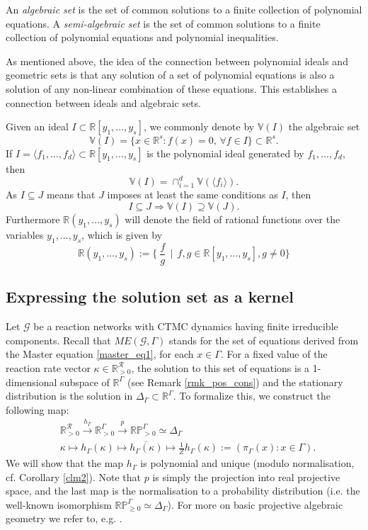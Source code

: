 \documentclass{amsart}
\theoremstyle{definition}
\theoremstyle{remark}
\theoremstyle{Conjecture/open problem}
\theoremstyle{assumption}
\theoremstyle{conjecture}
\newcommand{\st}{\,\mid \,}
\def\Pr{\mathbb{P}}
\def\Ga{\Gamma}
\def\k{\kappa}
\def\cG{\mathcal{G}}
\def\cR{\mathcal{R}}
\def\R{\mathbb{R}}
\numberwithin{equation}{section}
\begin{document}
An \emph{algebraic set} is the set of common solutions to a finite collection of polynomial equations. A \emph{semi-algebraic set} is the set of common solutions to a finite collection of polynomial equations and polynomial inequalities.

As mentioned above, the idea of the connection between polynomial ideals and geometric sets is that any solution of a set of polynomial equations is also a solution of any non-linear combination of these equations. This establishes a connection between ideals and algebraic sets. 

Given an ideal $I\subset \mathbb{R}[y_1,\ldots ,y_s]$, we commonly denote by $\mathbb{V}(I)$ the algebraic set
$$\mathbb{V}(I)=\{ x\in \mathbb{R}^s:f(x)=0,\, \forall f\in I\}\subset \mathbb{R}^s\mbox{.}$$
If $I=\langle f_1,\ldots ,f_d\rangle \subset \mathbb{R}[y_1,\ldots ,y_s]$ is the polynomial ideal generated by $f_1,\ldots ,f_d$, then 
$$\mathbb{V}(I)=\cap _{i=1}^{d}{\mathbb{V}(\langle f_i\rangle )}\mbox{.}$$
As $I\subseteq J$ means that $J$ imposes at least the same conditions as $I$, then
$$I\subseteq J\Longrightarrow \mathbb{V}(I)\supseteq\mathbb{V}(J)\mbox{.}$$
Furthermore $\mathbb{R}(y_1,\ldots ,y_s)$ will denote the field of rational functions over the variables $y_1,\ldots ,y_s$, which is given by
$$\mathbb{R}(y_1,\ldots ,y_s):=\{\ \frac{f}{g}\st f,g\in\mathbb{R}[y_1,\ldots ,y_s],g\not = 0\} $$


\subsection{Expressing the solution set as a kernel}\label{h}\hfill\break
Let $\mathcal{G}$ be a reaction networks with CTMC dynamics having finite irreducible components. Recall that $ME(\cG,\Ga)$ stands for the set of equations derived from the Master equation \eqref{master_eq1}, for each $x\in \Gamma $. For a fixed value of the reaction rate vector $\k\in\R^\cR_{>0}$, the solution to this set of equations is a 1-dimensional subspace of $\R^\Ga$ (see Remark \ref{rmk_pos_cons}) and the stationary distribution is the solution in $\Delta_{\Ga}\subset \R^\Ga$. To formalize this, we construct the following map:
\begin{align}\label{eq:map_h_G}&\R^\cR_{>0}\xrightarrow{h_\Ga}\R^\Ga_{>0}\xrightarrow{ p }\R\Pr^\Ga_{>0}\simeq\Delta_{\Ga}\\
&\k\mapsto h_\Ga(\k)\mapsto \overline{h_\Ga(\k)}\mapsto \frac{1}{Z}h_\Ga(\k):=(\pi_\Ga(x):x\in\Ga)\mbox{.}\nonumber \end{align}
We will show that the map $h_\Ga$ is polynomial and unique (modulo normalisation, cf. Corollary \ref{clm2}). Note that $p$ is simply the projection into real projective space, and the last map is the normalisation to a probability distribution (i.e. the well-known isomorphism $\R\Pr^\Ga_{\geq 0}\simeq \Delta_{\Ga}$). For more on basic projective algebraic geometry  we refer to, e.g. \cite[Section 8]{Cox}.
\end{document}
